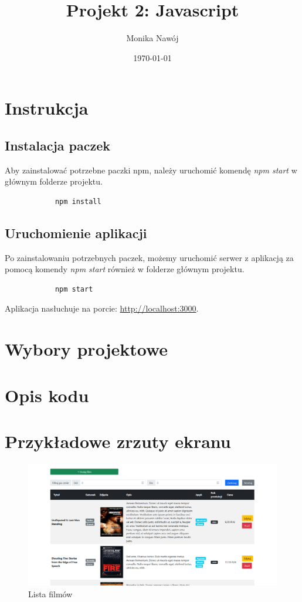 \documentclass[
    12pt, %
]{fphw}
\title{Projekt 2: Javascript} %
\author{Monika Nawój} %
\date{\today} %
\institute{Politechnika Warszawska \\ Wydział Elektroniki i Technik Informacyjnych} %
\begin{document}
    \maketitle %

    \section{Instrukcja}
    \subsection{Instalacja paczek}
    Aby zainstalować potrzebne paczki npm, należy uruchomić komendę \textit{npm start} w głównym folderze projektu.
        \begin{lstlisting}
            npm install
        \end{lstlisting}
    \subsection{Uruchomienie aplikacji}
    Po zainstalowaniu potrzebnych paczek, możemy uruchomić serwer z aplikacją za pomocą komendy \textit{npm start}
    również w folderze głównym projektu.
    \begin{lstlisting}
            npm start
    \end{lstlisting}
    Aplikacja nasłuchuje na porcie: \url{http://localhost:3000}.
    \section{Wybory projektowe}
    \section{Opis kodu}
    \section{Przykładowe zrzuty ekranu}
    \begin{figure}[H]
        \includegraphics[width=\linewidth]{./assets/1.PNG}
        \caption{Lista filmów}
        \label{fig:movie-list}
    \end{figure}
\end{document}
